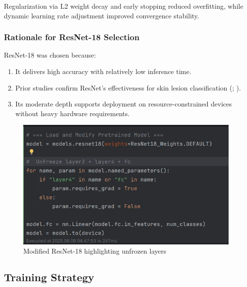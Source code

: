 \documentclass[
  12pt,
  oneside]{article}
\providecommand{\tightlist}{%
  \setlength{\itemsep}{0pt}\setlength{\parskip}{0pt}}
\begin{document}
Regularization via L2 weight decay and early stopping reduced
overfitting, while dynamic learning rate adjustment improved convergence
stability.

\subsubsection{Rationale for ResNet-18
Selection}\label{rationale-for-resnet-18-selection}

ResNet-18 was chosen because:

\begin{enumerate}
\def\labelenumi{\arabic{enumi}.}
\tightlist
\item
  It delivers high accuracy with relatively low inference time.
\item
  Prior studies confirm ResNet's effectiveness for skin lesion
  classification (;
  ).
\item
  Its moderate depth supports deployment on resource-constrained devices
  without heavy hardware requirements.
\end{enumerate}

\begin{figure}

{\centering \includegraphics[width=1\linewidth]{unfrozen_layers} 

}

\caption{Modified ResNet-18 highlighting unfrozen layers}\label{fig:unnamed-chunk-4}
\end{figure}

\subsection{Training Strategy}\label{training-strategy}
\end{document}
